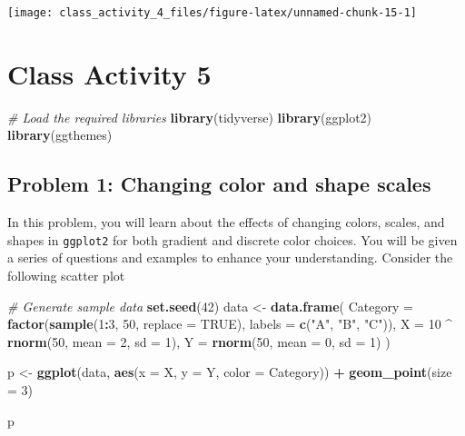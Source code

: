 \documentclass[
]{book}
\newenvironment{Shaded}{\begin{snugshade}}{\end{snugshade}}
\newcommand{\AttributeTok}[1]{\textcolor[rgb]{0.13,0.29,0.53}{#1}}
\newcommand{\CommentTok}[1]{\textcolor[rgb]{0.56,0.35,0.01}{\textit{#1}}}
\newcommand{\ConstantTok}[1]{\textcolor[rgb]{0.56,0.35,0.01}{#1}}
\newcommand{\DecValTok}[1]{\textcolor[rgb]{0.00,0.00,0.81}{#1}}
\newcommand{\FunctionTok}[1]{\textcolor[rgb]{0.13,0.29,0.53}{\textbf{#1}}}
\newcommand{\NormalTok}[1]{#1}
\newcommand{\OtherTok}[1]{\textcolor[rgb]{0.56,0.35,0.01}{#1}}
\newcommand{\SpecialCharTok}[1]{\textcolor[rgb]{0.81,0.36,0.00}{\textbf{#1}}}
\newcommand{\StringTok}[1]{\textcolor[rgb]{0.31,0.60,0.02}{#1}}
\begin{document}
\texttt{[image: class\_activity\_4\_files/figure-latex/unnamed-chunk-15-1]}

\hypertarget{class-activity-5}{%
\chapter{Class Activity 5}\label{class-activity-5}}

\begin{Shaded}
\begin{Highlighting}[]
\CommentTok{\# Load the required libraries}
\FunctionTok{library}\NormalTok{(tidyverse)}
\FunctionTok{library}\NormalTok{(ggplot2)}
\FunctionTok{library}\NormalTok{(ggthemes)}
\end{Highlighting}
\end{Shaded}

\hypertarget{problem-1-changing-color-and-shape-scales}{%
\section{Problem 1: Changing color and shape scales}\label{problem-1-changing-color-and-shape-scales}}

In this problem, you will learn about the effects of changing colors, scales, and shapes in \texttt{ggplot2} for both gradient and discrete color choices. You will be given a series of questions and examples to enhance your understanding. Consider the following scatter plot

\begin{Shaded}
\begin{Highlighting}[]
\CommentTok{\# Generate sample data}
\FunctionTok{set.seed}\NormalTok{(}\DecValTok{42}\NormalTok{)}
\NormalTok{data }\OtherTok{\textless{}{-}} \FunctionTok{data.frame}\NormalTok{(}
  \AttributeTok{Category =} \FunctionTok{factor}\NormalTok{(}\FunctionTok{sample}\NormalTok{(}\DecValTok{1}\SpecialCharTok{:}\DecValTok{3}\NormalTok{, }\DecValTok{50}\NormalTok{, }\AttributeTok{replace =} \ConstantTok{TRUE}\NormalTok{), }\AttributeTok{labels =} \FunctionTok{c}\NormalTok{(}\StringTok{"A"}\NormalTok{, }\StringTok{"B"}\NormalTok{, }\StringTok{"C"}\NormalTok{)),}
  \AttributeTok{X =} \DecValTok{10} \SpecialCharTok{\^{}} \FunctionTok{rnorm}\NormalTok{(}\DecValTok{50}\NormalTok{, }\AttributeTok{mean =} \DecValTok{2}\NormalTok{, }\AttributeTok{sd =} \DecValTok{1}\NormalTok{),}
  \AttributeTok{Y =} \FunctionTok{rnorm}\NormalTok{(}\DecValTok{50}\NormalTok{, }\AttributeTok{mean =} \DecValTok{0}\NormalTok{, }\AttributeTok{sd =} \DecValTok{1}\NormalTok{)}
\NormalTok{)}

\NormalTok{p }\OtherTok{\textless{}{-}} \FunctionTok{ggplot}\NormalTok{(data, }\FunctionTok{aes}\NormalTok{(}\AttributeTok{x =}\NormalTok{ X, }\AttributeTok{y =}\NormalTok{ Y, }\AttributeTok{color =}\NormalTok{ Category)) }\SpecialCharTok{+}
  \FunctionTok{geom\_point}\NormalTok{(}\AttributeTok{size =} \DecValTok{3}\NormalTok{)}

\NormalTok{p}
\end{Highlighting}
\end{Shaded}
\end{document}
